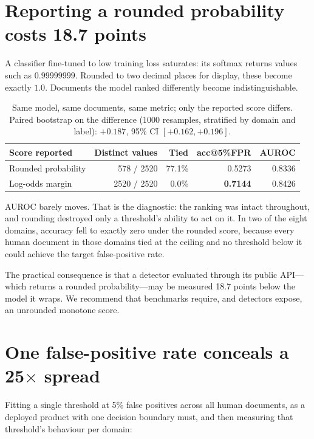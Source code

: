 \documentclass[11pt]{article}
\begin{document}
\section{Reporting a rounded probability costs 18.7 points}
\label{sec:rounding}

A classifier fine-tuned to low training loss saturates: its softmax returns
values such as $0.99999999$. Rounded to two decimal places for display, these
become exactly $1.0$. Documents the model ranked differently become
indistinguishable.

\begin{table}[h]
\centering
\begin{tabular}{lrrrr}
\toprule
Score reported & Distinct values & Tied & acc@5\%FPR & AUROC \\
\midrule
Rounded probability & 578 / 2520 & 77.1\% & 0.5273 & 0.8336 \\
Log-odds margin     & 2520 / 2520 & 0.0\% & \textbf{0.7144} & 0.8426 \\
\bottomrule
\end{tabular}
\caption{Same model, same documents, same metric; only the reported score
differs. Paired bootstrap on the difference (1000 resamples, stratified by
domain and label): $+0.187$, 95\% CI $[+0.162, +0.196]$.}
\end{table}

AUROC barely moves. That is the diagnostic: the ranking was intact throughout,
and rounding destroyed only a threshold's ability to act on it. In two of the
eight domains, accuracy fell to exactly zero under the rounded score, because
every human document in those domains tied at the ceiling and no threshold below
it could achieve the target false-positive rate.

The practical consequence is that a detector evaluated through its public
API---which returns a rounded probability---may be measured 18.7 points below the
model it wraps. We recommend that benchmarks require, and detectors expose, an
unrounded monotone score.

\section{One false-positive rate conceals a 25$\times$ spread}
\label{sec:fpr}

Fitting a single threshold at 5\% false positives across all human documents, as
a deployed product with one decision boundary must, and then measuring that
threshold's behaviour per domain:
\end{document}
